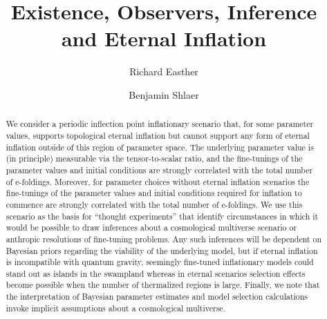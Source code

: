\documentclass[aps,amsfonts,amsmath,prd,preprint,nofootinbib]{revtex4}
\begin{document}
\title{Existence, Observers, Inference and Eternal Inflation}

\author{Richard Easther}
\author{Benjamin Shlaer} 

\address{Department of Physics, University of Auckland, Private Bag 92019, Auckland, New Zealand}



\begin{abstract}

We consider a periodic inflection point inflationary scenario that, for some parameter values, supports  topological eternal inflation but cannot support any form of eternal inflation outside of this region of parameter space. The underlying parameter value is (in principle) measurable via the tensor-to-scalar ratio, and  the fine-tunings of the parameter values and initial conditions are strongly correlated with the total number of e-foldings.  Moreover, for parameter choices without eternal inflation scenarios the fine-tunings of the parameter values and initial conditions required for inflation to commence are strongly correlated with the total number of e-foldings.  We use this scenario as the basis for ``thought experiments'' that identify circumstances in which it would be possible to draw inferences about a cosmological multiverse scenario or anthropic resolutions of fine-tuning problems. Any such inferences will be dependent on Bayesian priors regarding the viability of the underlying model, but if eternal inflation is incompatible with quantum gravity,  seemingly fine-tuned inflationary models could stand out as islands in the swampland whereas in eternal scenarios selection effects become possible when the number of thermalized regions is large.  Finally, we note that the interpretation of Bayesian parameter estimates and model selection calculations invoke implicit assumptions about a cosmological multiverse.   


\end{abstract}
\end{document}
